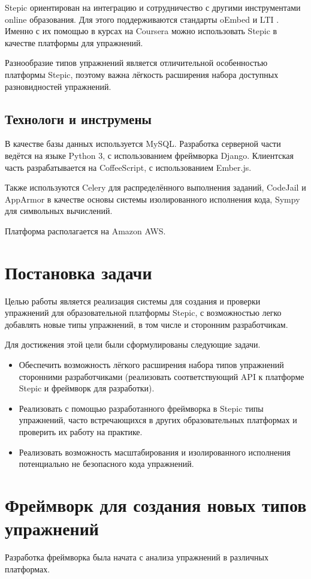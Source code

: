 \documentclass{matmex-diploma-custom}
\begin{document}
Stepic ориентирован на интеграцию и сотрудничество с другими
инструментами online образования. Для этого поддерживаются стандарты
oEmbed и LTI  \cite{dagger2007service}. Именно с их помощью в курсах на
Coursera можно использовать Stepic в качестве платформы для
упражнений.

Разнообразие типов упражнений является отличительной особенностью
платформы Stepic, поэтому важна лёгкость расширения набора доступных
разновидностей упражнений.

\subsection{Технологи и инструмены}
В качестве базы данных используется MySQL. Разработка серверной части
ведётся на языке Python 3, с использованием фреймворка
Django. Клиентская часть разрабатывается на CoffeeScript, с
использованием Ember.js.

Также используются Celery для распределённого выполнения заданий,
CodeJail и AppArmor в качестве основы системы изолированного
исполнения кода, Sympy для символьных вычислений.

Платформа располагается на Amazon AWS.

\section{Постановка задачи}
Целью работы является реализация системы для создания и проверки
упражнений для образовательной платформы Stepic, с возможностью легко
добавлять новые типы упражнений, в том числе и сторонним
разработчикам.

Для достижения этой цели были сформулированы следующие задачи.

\begin{itemize}
\item Обеспечить возможность лёгкого расширения набора типов
  упражнений сторонними разработчиками (реализовать соответствующий
  API к платформе Stepic и фреймворк для разработки).
\item Реализовать с помощью разработанного фреймворка в Stepic типы
  упражнений, часто встречающихся в других образовательных платформах
  и проверить их работу на практике.
\item Реализовать возможность масштабирования и изолированного
  исполнения потенциально не безопасного кода упражнений.
\end{itemize}

\section{Фреймворк для создания новых типов упражнений}
Разработка фреймворка была начата с анализа упражнений в различных
платформах.
\end{document}
